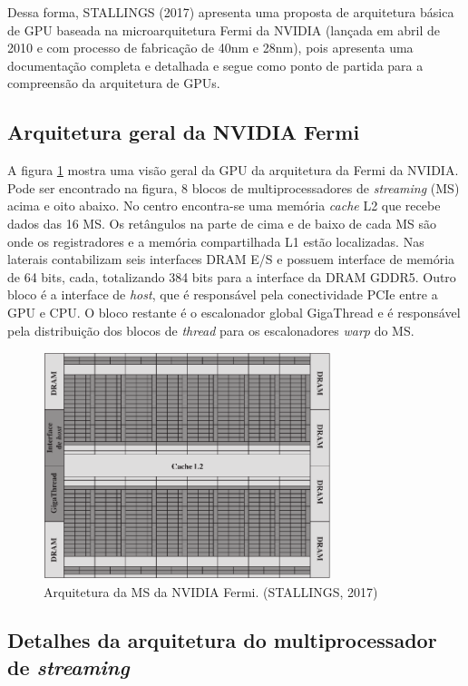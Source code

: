 Dessa forma, STALLINGS (2017) apresenta uma proposta de arquitetura básica de GPU baseada na microarquitetura Fermi da NVIDIA (lançada em abril de 2010 e com processo de fabricação de 40nm e 28nm), pois apresenta uma documentação completa e detalhada e segue como ponto de partida para a compreensão da arquitetura de GPUs.

\subsection{Arquitetura geral da NVIDIA Fermi}

A figura \ref{arq:fermi:1} mostra uma visão geral da GPU da arquitetura da Fermi da NVIDIA. Pode ser encontrado na figura, 8 blocos de multiprocessadores de \textit{streaming} (MS) acima e oito abaixo. No centro encontra-se uma memória \textit{cache} L2 que recebe dados das 16 MS. Os retângulos na parte de cima e de baixo de cada MS são onde os registradores e a memória compartilhada L1 estão localizadas. Nas laterais contabilizam seis interfaces DRAM E/S e possuem interface de memória de 64 bits, cada, totalizando 384 bits para a interface da DRAM GDDR5. Outro bloco é a interface de \textit{host}, que é responsável pela conectividade PCIe entre a GPU e CPU. O bloco restante é o escalonador global GigaThread e é responsável pela distribuição dos blocos de \textit{thread} para os escalonadores \textit{warp }do MS.


\begin{figure}
\centering
\includegraphics[width=8.4cm]{arquitetura.png} 
\caption{Arquitetura da MS da NVIDIA Fermi. (STALLINGS, 2017)} 
\label{arq:fermi:1}
\end{figure}

\subsection{Detalhes da arquitetura do multiprocessador de \textit{streaming}}

